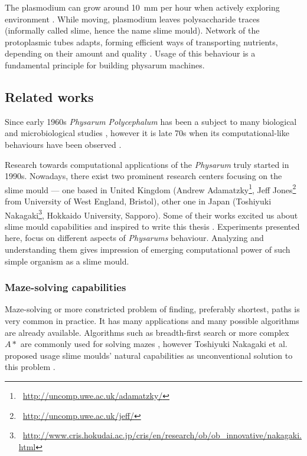 The plasmodium can grow around 10~mm per hour when actively exploring environment \cite{coggin1996dynamic}. While moving, plasmodium leaves polysaccharide traces (informally called slime, hence the name slime mould). Network of the protoplasmic tubes adapts, forming efficient ways of transporting nutrients, depending on their amount and quality \cite{nakagaki2004obtaining}. Usage of this behaviour is a fundamental principle for building physarum machines.


\subsection{Related works}

Since early 1960s \textit{Physarum Polycephalum} has been a subject to many biological and microbiological studies \cite{guttes1964mitotic,daniel1962method}, however it is late 70s when its computational-like behaviours have been observed \cite{wohlfarth1979oscillatory}.

Research towards computational applications of the \textit{Physarum} truly started in 1990s. Nowadays, there exist two prominent research centers focusing on the slime mould --- one based in United Kingdom (Andrew Adamatzky\footnote{~\url{http://uncomp.uwe.ac.uk/adamatzky/}}, Jeff Jones\footnote{~\url{http://uncomp.uwe.ac.uk/jeff/}} from University of West England, Bristol), other one in Japan (Toshiyuki Nakagaki\footnote{~\url{http://www.cris.hokudai.ac.jp/cris/en/research/ob/ob\_innovative/nakagaki.html}}, Hokkaido University, Sapporo). Some of their works excited us about slime mould capabilities and inspired to write this thesis \cite{nakagaki2000intelligence,adamatzky2010physarum,jones2015pattern,adamatzky2007physarum}. Experiments presented here, focus on different aspects of \textit{Physarums} behaviour. Analyzing and understanding them gives impression of emerging computational power of such simple organism as a slime mould.


\subsubsection{Maze-solving capabilities}

Maze-solving or more constricted problem of finding, preferably shortest, paths is very common in practice. It has many applications and many possible algorithms are already available. Algorithms such as breadth-first search or more complex $A*$ are commonly used for solving mazes \cite{zelkowitz1979principles}, however Toshiyuki Nakagaki et al. proposed usage slime moulds' natural capabilities as unconventional solution to this problem \cite{nakagaki2000intelligence}.

